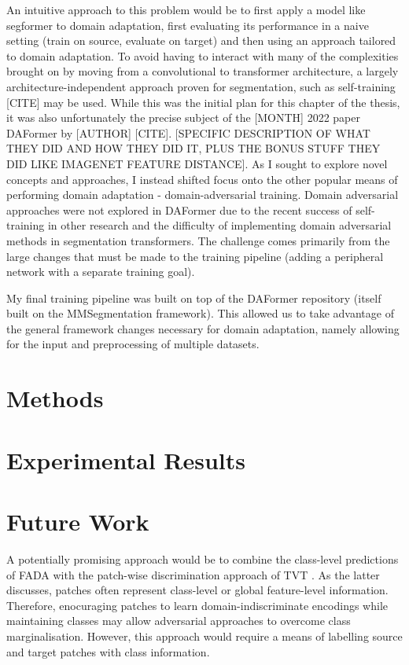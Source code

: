 \documentclass[a4paper,12pt]{report}
\begin{document}
An intuitive approach to this problem would be to first apply a model like segformer to domain adaptation, first evaluating its performance in a naive setting (train on source, evaluate on target) and then using an approach tailored to domain adaptation. To avoid having to interact with many of the complexities brought on by moving from a convolutional to transformer architecture, a largely architecture-independent approach proven for segmentation, such as self-training [CITE] may be used. While this was the initial plan for this chapter of the thesis, it was also unfortunately the precise subject of the [MONTH] 2022 paper DAFormer by [AUTHOR] [CITE]. [SPECIFIC DESCRIPTION OF WHAT THEY DID AND HOW THEY DID IT, PLUS THE BONUS STUFF THEY DID LIKE IMAGENET FEATURE DISTANCE]. As I sought to explore novel concepts and approaches, I instead shifted focus onto the other popular means of performing domain adaptation - domain-adversarial training. Domain adversarial approaches were not explored in DAFormer due to the recent success of self-training in other research and the difficulty of implementing domain adversarial methods in segmentation transformers. The challenge comes primarily from the large changes that must be made to the training pipeline (adding a peripheral network with a separate training goal).

My final training pipeline was built on top of the DAFormer repository (itself built on the MMSegmentation framework). This allowed us to take advantage of the general framework changes necessary for domain adaptation, namely allowing for the input and preprocessing of multiple datasets.


\section{Methods}

\section{Experimental Results}

\section{Future Work}
A potentially promising approach would be to combine the class-level predictions of FADA \cite{wang_classes_2020} with the patch-wise discrimination approach of TVT \cite{yang_tvt_2021}. As the latter discusses, patches often represent class-level or global feature-level information. Therefore, enocuraging patches to learn domain-indiscriminate encodings while maintaining classes may allow adversarial approaches to overcome class marginalisation. However, this approach would require a means of labelling source and target patches with class information.
\end{document}
